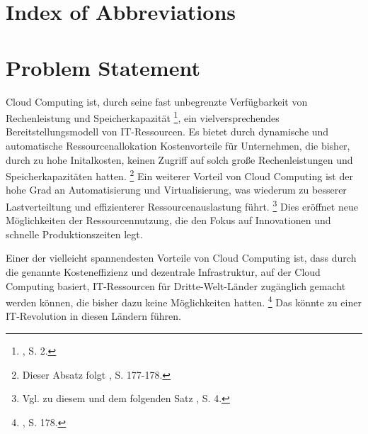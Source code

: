 \documentclass[
	a4paper,
	oneside,
	12pt,
	liststotocnumbered
]{article}
\let\cite\textcite
\begin{document}



\tableofcontents
\newpage

\section*{Index of Abbreviations}
\begin{acronym}[TTTTTTTTTTTTTTTTTTTT]
\end{acronym}
\newpage

\normalsize
{}

\section{Problem Statement}
Cloud Computing ist, durch seine fast unbegrenzte Verfügbarkeit von Rechenleistung und Speicherkapazität
\footnote{\cite{Nallur.2012}, S. 2.}, 
ein vielversprechendes Bereitstellungsmodell von IT-Ressourcen. Es bietet durch dynamische und automatische Ressourcenallokation Kostenvorteile für Unternehmen, die bisher, durch zu hohe Initalkosten, keinen Zugriff auf solch große Rechenleistungen und Speicherkapazitäten hatten. 
\footnote{Dieser Absatz folgt \cite{Marston.2011}, S. 177-178.}
Ein weiterer Vorteil von Cloud Computing ist der hohe Grad an Automatisierung und Virtualisierung, was wiederum zu besserer Lastverteiltung und effizienterer Ressourcenauslastung führt.
\footnote{Vgl. zu diesem und dem folgenden Satz \cite{Boss.2007}, S. 4.}
Dies eröffnet neue Möglichkeiten der Ressourcennutzung, die den Fokus auf Innovationen und schnelle Produktionszeiten legt.

Einer der vielleicht spannendesten Vorteile von Cloud Computing ist, dass durch die genannte Kosteneffizienz und dezentrale Infrastruktur, auf der Cloud Computing basiert, IT-Ressourcen für Dritte-Welt-Länder zugänglich gemacht werden können, die bisher dazu keine Möglichkeiten hatten. 
\footnote{\cite{Marston.2011}, S. 178.}
Das könnte zu einer IT-Revolution in diesen Ländern führen.
\end{document}
